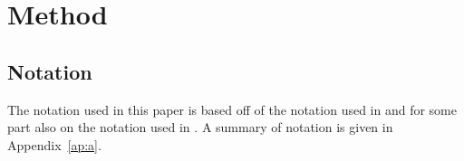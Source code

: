 
\section{Method}\label{sec:method}

\subsection{Notation}

The notation used in this paper is based off of the notation used in \Textcite{van_ditmarsch_dynamic_2018} and for some part also on the notation used in \textcite{van_ditmarsch_strengthening_2019}.
A summary of notation is given in Appendix~\ref{ap:a}.
